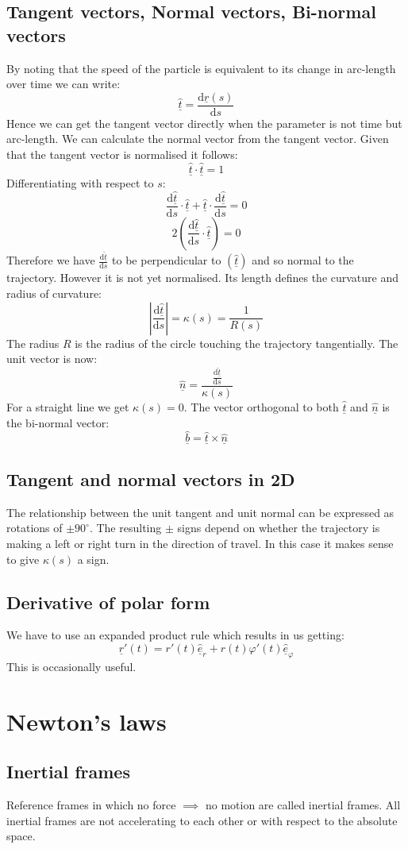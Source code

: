 \documentclass[12pt]{article}
\newcommand{\uvec}[1]{\underline{\hat{#1}}}
\newcommand{\bvec}[1]{\uvec{e}_#1}
\newcommand{\df}[2]{\frac{\text{d}#1}{\text{d}#2}}
\begin{document}
\subsection*{Tangent vectors, Normal vectors, Bi-normal vectors}
By noting that the speed of the particle is equivalent to its change in arc-length over time we can write:
\[\uvec{t}=\df{\underline{r}(s)}{s}\]
Hence we can get the tangent vector directly when the parameter is not time but arc-length. We can calculate the normal vector from the tangent vector. Given that the tangent vector is normalised it follows:
\[\uvec{t}\cdot\uvec{t}=1\]
Differentiating with respect to \(s\):
\[\df{\uvec{t}}{s}\cdot\uvec{t}+\uvec{t}\cdot\df{\uvec{t}}{s}=0\]
\[2\left(\df{\uvec{t}}{s}\cdot\uvec{t}\right)=0\]
Therefore we have \(\df{\uvec{t}}{s}\) to be perpendicular to \((\uvec{t})\) and so normal to the trajectory. However it is not yet normalised. Its length defines the curvature and radius of curvature:
\[\left\vert\df{\uvec{t}}{s}\right\vert=\kappa(s)=\frac{1}{R(s)}\]
The radius \(R\) is the radius of the circle touching the trajectory tangentially. The unit vector is now:
\[\uvec{n}=\frac{\df{\uvec{t}}{s}}{\kappa(s)}\]
For a straight line we get \(\kappa(s)=0\). The vector orthogonal to both \(\uvec{t}\) and \(\uvec{n}\) is the bi-normal vector:
\[\uvec{b}=\uvec{t}\times\uvec{n}\]
\subsection*{Tangent and normal vectors in 2D}
The relationship between the unit tangent and unit normal can be expressed as rotations of \(\pm 90^{\circ}\). The resulting \(\pm\) signs depend on whether the trajectory is making a left or right turn in the direction of travel. In this case it makes sense to give \(\kappa(s)\) a sign.
\subsection*{Derivative of polar form}
We have to use an expanded product rule which results in us getting:
\[\underline{r}'(t)=r'(t)\bvec{r}+r(t)\varphi'(t)\bvec{\varphi}\]
This is occasionally useful.
\section{Newton's laws}
\subsection*{Inertial frames}
Reference frames in which no force \(\implies\) no motion are called inertial frames. All inertial frames are not accelerating to each other or with respect to the absolute space.
\end{document}
